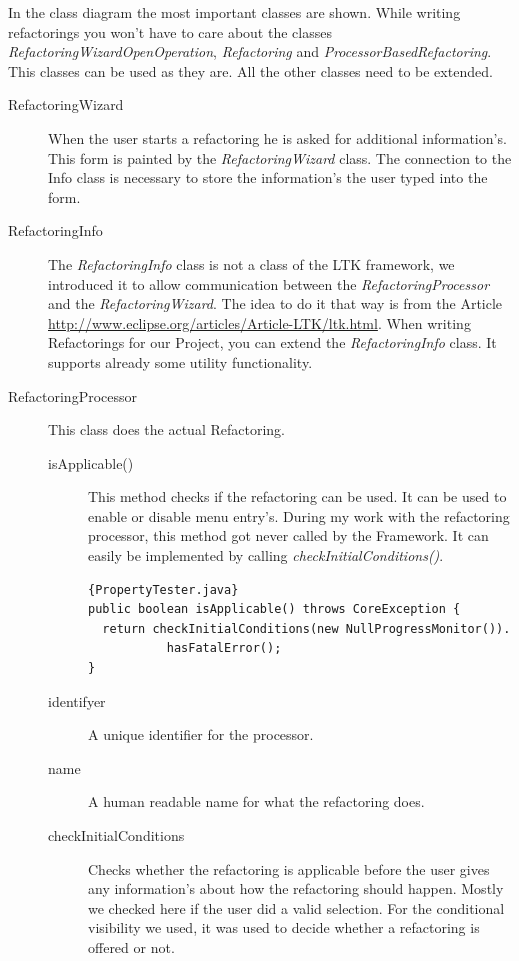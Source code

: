 \documentclass[a4paper,10pt]{report}
\begin{document}
In the class diagram the most important classes are shown. While writing refactorings you won't have to care about the classes {\it RefactoringWizardOpenOperation}, {\it Refactoring} and {\it ProcessorBasedRefactoring}. This 
classes can be used as they are. All the other classes need to be extended.
\begin{description}
 \item[RefactoringWizard] When the user starts a refactoring he is asked for additional information's. This form is painted by the {\it RefactoringWizard} class.
The connection to the Info class is necessary to store the information's the user typed into the form. 
 \item[RefactoringInfo] The {\it RefactoringInfo} class is not a class of the LTK framework, we introduced it to allow communication between the {\it RefactoringProcessor} and the {\it RefactoringWizard}. 
The idea to do it that way is from the Article \href{http://www.eclipse.org/articles/Article-LTK/ltk.html}{http://www.eclipse.org/articles/Article-LTK/ltk.html}. When writing Refactorings for our Project, you can extend the 
{\it RefactoringInfo} class. It supports already some utility functionality.
 \item[RefactoringProcessor] This class does the actual Refactoring. 
\begin{description}
 \item[isApplicable()] This method checks if the refactoring can be used. It can be used to enable or disable menu entry's. During my work with the refactoring processor, this 
method got never called by the Framework. It can easily be implemented by calling {\it checkInitialConditions()}.
\begin{lstlisting}[caption=Generic isApplicable Implementation]{PropertyTester.java}
public boolean isApplicable() throws CoreException {
  return checkInitialConditions(new NullProgressMonitor()).
           hasFatalError();
}
\end{lstlisting}
\item[identifyer] A unique identifier for the processor.
\item[name] A human readable name for what the refactoring does.
\item[checkInitialConditions] Checks whether the refactoring is applicable before the user gives any information's about how the refactoring should happen. Mostly we checked
here if the user did a valid selection. For the conditional visibility we used, it was used to decide whether a refactoring is offered or not.

\end{description}
\end{description}
\end{document}
